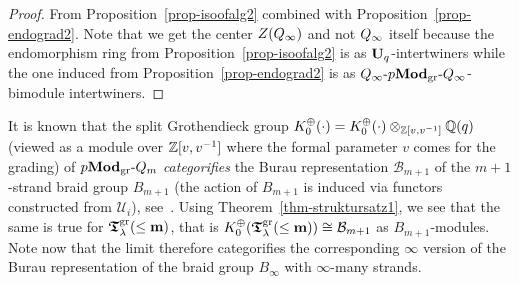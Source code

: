 \begin{proof}
From Proposition~\ref{prop-isoofalg2} 
combined with Proposition~\ref{prop-endograd2}. 
Note that we get the center $Z(Q_{\infty})$ and not $Q_{\infty}$ 
itself because the endomorphism ring from 
Proposition~\ref{prop-isoofalg2} is as 
$\boldsymbol{\mathrm{U}}_q$-intertwiners while the one induced from 
Proposition~\ref{prop-endograd2} is as $Q_{\infty}\text{-}p\boldsymbol{\mathrm{Mod}}_{\mathrm{gr}}\text{-}Q_{\infty}$-bimodule intertwiners.
\end{proof}



\begin{rem}\label{rem-grothendieck1a}
It is known 
that the split Grothendieck group 
$K_0^{\oplus}(\cdot)=K_0^{\oplus}(\cdot)\otimes_{\mathbb{Z}[v,v^{-1}]}\mathbb{Q}(q)$ 
(viewed as a module over $\mathbb{Z}[v,v^{-1}]$ where the 
formal parameter $v$ comes for the grading) of 
$p\boldsymbol{\mathrm{Mod}}_{\mathrm{gr}}\text{-}Q_m$ \textit{categorifies} the Burau 
representation $\mathcal B_{m+1}$ of the 
$m+1$-strand braid group $B_{m+1}$ 
(the action of $B_{m+1}$ is induced via 
functors constructed from $\mathcal U_i$), see~\cite[Proposition~2.8 and Subsection 2.d]{ks1}. 
Using Theorem~\ref{thm-struktursatz1}, we see that the 
same is true for $\boldsymbol{\mathfrak{T}}_{\lambda}^{\mathrm{gr}}(\leq\boldsymbol{\mathrm{m}})$, that is 
$K_0^{\oplus}(\boldsymbol{\mathfrak{T}}_{\lambda}^{\mathrm{gr}}(\leq\boldsymbol{\mathrm{m}}))\cong\mathcal B_{m+1}$ as 
$B_{m+1}$-modules. Note now that the limit therefore 
categorifies the corresponding $\infty$ version of 
the Burau representation of the braid 
group $B_{\infty}$ with $\infty$-many strands.
\end{rem}



